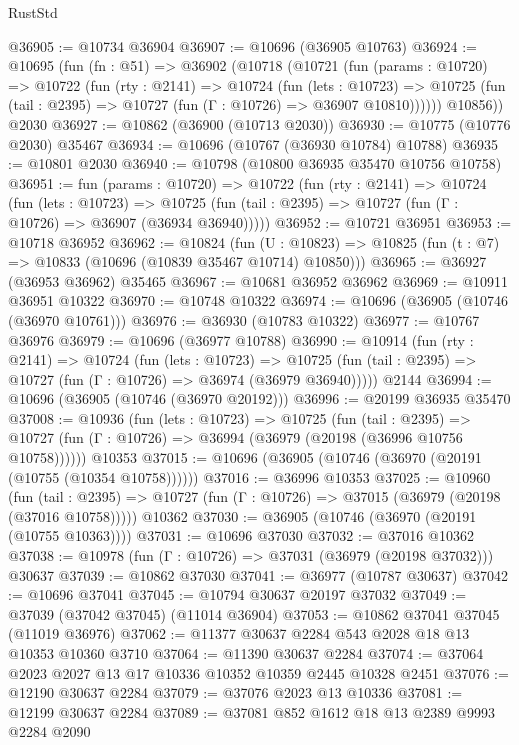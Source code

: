 \begin{lexlean}{RustStd}
\begin{coremodule}
@36905 := @10734 @36904
@36907 := @10696 (@36905 @10763)
@36924 := @10695
    (fun (fn : @51) =>
    @36902
      (@10718
        (@10721
          (fun (params : @10720) =>
          @10722
            (fun (rty : @2141) =>
            @10724
              (fun (lets : @10723) =>
              @10725 (fun (tail : @2395) => @10727 (fun (Γ : @10726) => @36907 @10810))))))
        @10856))
    @2030
@36927 := @10862 (@36900 (@10713 @2030))
@36930 := @10775 (@10776 @2030) @35467
@36934 := @10696 (@10767 (@36930 @10784) @10788)
@36935 := @10801 @2030
@36940 := @10798 (@10800 @36935 @35470 @10756 @10758)
@36951 := fun (params : @10720) =>
  @10722
    (fun (rty : @2141) =>
    @10724
      (fun (lets : @10723) =>
      @10725 (fun (tail : @2395) => @10727 (fun (Γ : @10726) => @36907 (@36934 @36940)))))
@36952 := @10721 @36951
@36953 := @10718 @36952
@36962 := @10824
    (fun (U : @10823) => @10825 (fun (t : @7) => @10833 (@10696 (@10839 @35467 @10714) @10850)))
@36965 := @36927 (@36953 @36962) @35465
@36967 := @10681 @36952 @36962
@36969 := @10911 @36951 @10322
@36970 := @10748 @10322
@36974 := @10696 (@36905 (@10746 (@36970 @10761)))
@36976 := @36930 (@10783 @10322)
@36977 := @10767 @36976
@36979 := @10696 (@36977 @10788)
@36990 := @10914
    (fun (rty : @2141) =>
    @10724
      (fun (lets : @10723) =>
      @10725 (fun (tail : @2395) => @10727 (fun (Γ : @10726) => @36974 (@36979 @36940)))))
    @2144
@36994 := @10696 (@36905 (@10746 (@36970 @20192)))
@36996 := @20199 @36935 @35470
@37008 := @10936
    (fun (lets : @10723) =>
    @10725
      (fun (tail : @2395) =>
      @10727 (fun (Γ : @10726) => @36994 (@36979 (@20198 (@36996 @10756 @10758))))))
    @10353
@37015 := @10696 (@36905 (@10746 (@36970 (@20191 (@10755 (@10354 @10758))))))
@37016 := @36996 @10353
@37025 := @10960
    (fun (tail : @2395) => @10727 (fun (Γ : @10726) => @37015 (@36979 (@20198 (@37016 @10758)))))
    @10362
@37030 := @36905 (@10746 (@36970 (@20191 (@10755 @10363))))
@37031 := @10696 @37030
@37032 := @37016 @10362
@37038 := @10978 (fun (Γ : @10726) => @37031 (@36979 (@20198 @37032))) @30637
@37039 := @10862 @37030
@37041 := @36977 (@10787 @30637)
@37042 := @10696 @37041
@37045 := @10794 @30637 @20197 @37032
@37049 := @37039 (@37042 @37045) (@11014 @36904)
@37053 := @10862 @37041 @37045 (@11019 @36976)
@37062 := @11377 @30637 @2284 @543 @2028 @18 @13 @10353 @10360 @3710
@37064 := @11390 @30637 @2284
@37074 := @37064 @2023 @2027 @13 @17 @10336 @10352 @10359 @2445 @10328 @2451
@37076 := @12190 @30637 @2284
@37079 := @37076 @2023 @13 @10336
@37081 := @12199 @30637 @2284
@37089 := @37081 @852 @1612 @18 @13 @2389 @9993 @2284 @2090

\end{coremodule}
\end{lexlean}

